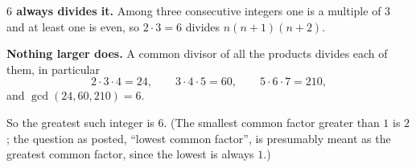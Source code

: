 \textbf{$6$ always divides it.} Among three consecutive integers one is a multiple of $3$ and at least one is even, so $2\cdot3=6$ divides $n(n+1)(n+2)$.

\textbf{Nothing larger does.} A common divisor of all the products divides each of them, in particular
\[
2\cdot3\cdot4=24,\qquad 3\cdot4\cdot5=60,\qquad 5\cdot6\cdot7=210,
\]
and $\gcd(24,60,210)=6$.

So the greatest such integer is $\boxed{6}$. (The smallest common factor greater than $1$ is $2$; the question as posted, ``lowest common factor'', is presumably meant as the greatest common factor, since the lowest is always $1$.)
